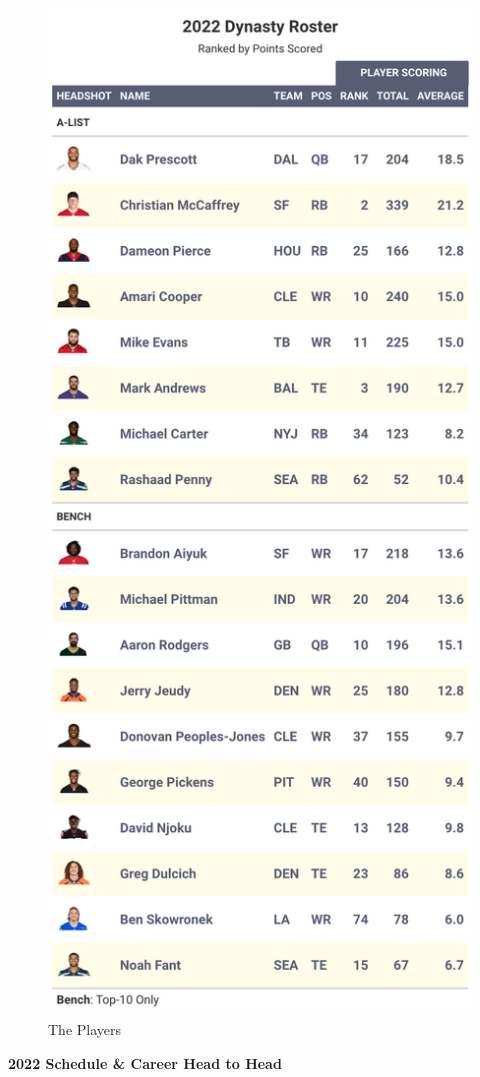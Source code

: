 \documentclass[
]{article}
\begin{document}
\begin{figure}
\includegraphics[width=0.75\linewidth,height=0.75\textheight]{output/2022/dynasty_roster_Alanasty} \caption{The Players}\label{fig:unnamed-chunk-6}
\end{figure}
\newpage

\textbf{2022 Schedule \& Career Head to Head}
\end{document}
